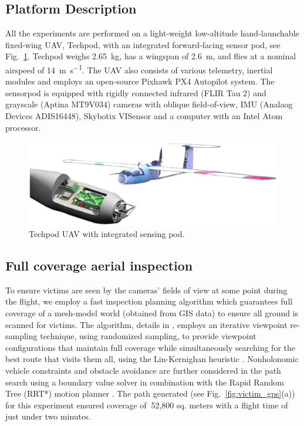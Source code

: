 \documentclass[runningheads]{llncs}
\begin{document}
\subsection{Platform Description}

All the experiments are performed on a light-weight low-altitude hand-launchable fixed-wing UAV, Techpod, with an integrated forward-facing sensor pod, see Fig.~\ref{fig:techpod}. Techpod weighs \SI{2.65}{\kilo\gram}, has a wingspan of \SI{2.6}{\meter}, and flies at a nominal airspeed of \SI{14}{\meter\per\second}. The UAV also consists of various telemetry, inertial modules and employs an open-source Pixhawk PX4 Autopilot \cite{meier2015px4} system. The sensorpod is equipped with rigidly connected infrared (FLIR Tau 2) and grayscale (Aptina MT9V034) cameras with oblique field-of-view, IMU (Analaog Devices ADIS16448), Skybotix VISensor \cite{Skybotix} and a computer with an Intel Atom processor.

\begin{figure}
\centerline{\includegraphics[width=\textwidth]{img/eps/techpod.eps}}
\caption{Techpod UAV with integrated sensing pod.}
\label{fig:techpod}
\end{figure}

\subsection{Full coverage aerial inspection}

To ensure victims are seen by the cameras' fields of view at some point during the flight, we employ a fast inspection planning algorithm which guarantees full coverage of a mesh-model world (obtained from GIS data) to ensure all ground is scanned for victims. The algorithm, details in \cite{7140101}, employs an iterative viewpoint re-sampling technique, using randomized sampling, to provide viewpoint configurations that maintain full coverage while simultaneously searching for the best route that visits them all, using the Lin-Kernighan heuristic \cite{lin1973effective}. Nonholonomic vehicle constraints and obstacle avoidance are further considered in the path search using a boundary value solver in combination with the Rapid Random Tree (RRT*) motion planner \cite{RRTS1a}. The path generated (see Fig.~\ref{fig:victim_gps}(a)) for this experiment ensured coverage of $~$52,800 sq. meters with a flight time of just under two minutes.
\end{document}
